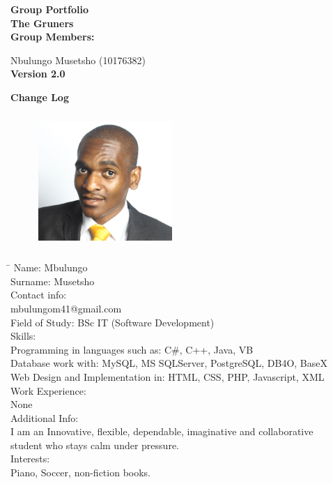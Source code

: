 \documentclass[12pt]{article}
\newcommand{\Title}{Group Portfolio} %
\begin{document}
	\begin{center}%
	
	  \LARGE \bf \Title \\[4em]
	  \LARGE {\bf The Gruners}\\[1em]
	  \LARGE {\bf Group Members:}\\[2em]
	  \large
	      
	      Nbulungo Musetsho				(10176382) \\[1em]
	      {\bf Version 2.0}	    
	\end{center}%
	
	\newpage
	{\LARGE \bf Change Log}\\[2em]	
		\begin{tabbing}
		
		\end{tabbing}



	\newpage
	\begin{figure}[ht!]
		\centering
		\includegraphics[width=2in, height=2in]{./Pictures/MbulungoMusetsho.jpg}
	\end{figure}
	
	\begin{tabbing}
		\hspace*{3.5cm}\=\hspace*{3cm} \kill
		Name: \> Mbulungo \\
		Surname: \> Musetsho \\
		Contact info:  \\
			\> mbulungom41@gmail.com \\
		Field of Study: \> BSc IT (Software Development) \\
		Skills: \\
			\> Programming in languages such as: C\#, C++, Java, VB \\
			\> Database work with: MySQL, MS SQLServer, PostgreSQL, DB4O, BaseX \\
			\> Web Design and Implementation in: HTML, CSS, PHP, Javascript, XML \\
		Work Experience: \\
			\> None \\
		Additional Info: \\
			\> I am an Innovative,  flexible, dependable, imaginative and collaborative \\ \> student who stays calm under pressure.\\
		Interests: \\
			\> Piano, Soccer, non-fiction books. \\
	\end{tabbing}
	
\end{document}
